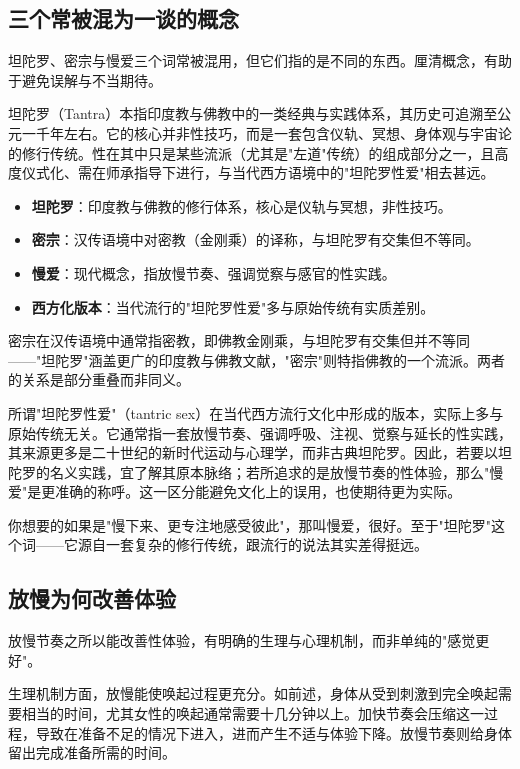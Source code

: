 \documentclass[12pt,UTF8]{ctexbook}
\newcommand{\keyword}[1]{\textbf{#1}}
\begin{document}
\subsection{三个常被混为一谈的概念}

坦陀罗、密宗与慢爱三个词常被混用，但它们指的是不同的东西。厘清概念，有助于避免误解与不当期待。

坦陀罗（Tantra）本指印度教与佛教中的一类经典与实践体系，其历史可追溯至公元一千年左右。它的核心并非性技巧，而是一套包含仪轨、冥想、身体观与宇宙论的修行传统。性在其中只是某些流派（尤其是"左道"传统）的组成部分之一，且高度仪式化、需在师承指导下进行，与当代西方语境中的"坦陀罗性爱"相去甚远。

\begin{itemize}
	\item \keyword{坦陀罗}：印度教与佛教的修行体系，核心是仪轨与冥想，非性技巧。
	\item \keyword{密宗}：汉传语境中对密教（金刚乘）的译称，与坦陀罗有交集但不等同。
	\item \keyword{慢爱}：现代概念，指放慢节奏、强调觉察与感官的性实践。
	\item \keyword{西方化版本}：当代流行的"坦陀罗性爱"多与原始传统有实质差别。
\end{itemize}

密宗在汉传语境中通常指密教，即佛教金刚乘，与坦陀罗有交集但并不等同——"坦陀罗"涵盖更广的印度教与佛教文献，"密宗"则特指佛教的一个流派。两者的关系是部分重叠而非同义。

所谓"坦陀罗性爱"（tantric sex）在当代西方流行文化中形成的版本，实际上多与原始传统无关。它通常指一套放慢节奏、强调呼吸、注视、觉察与延长的性实践，其来源更多是二十世纪的新时代运动与心理学，而非古典坦陀罗。因此，若要以坦陀罗的名义实践，宜了解其原本脉络；若所追求的是放慢节奏的性体验，那么"慢爱"是更准确的称呼。这一区分能避免文化上的误用，也使期待更为实际。

\begin{tcolorbox}[colback=pink!5!white,colframe=red!50!black,title=贴心小叮咛]
	你想要的如果是"慢下来、更专注地感受彼此"，那叫慢爱，很好。至于"坦陀罗"这个词——它源自一套复杂的修行传统，跟流行的说法其实差得挺远。
\end{tcolorbox}
\subsection{放慢为何改善体验}

放慢节奏之所以能改善性体验，有明确的生理与心理机制，而非单纯的"感觉更好"。

生理机制方面，放慢能使唤起过程更充分。如前述，身体从受到刺激到完全唤起需要相当的时间，尤其女性的唤起通常需要十几分钟以上。加快节奏会压缩这一过程，导致在准备不足的情况下进入，进而产生不适与体验下降。放慢节奏则给身体留出完成准备所需的时间。
\end{document}
